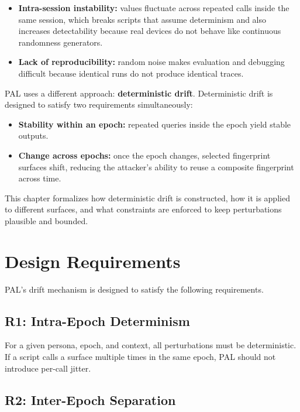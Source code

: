 \documentclass[11pt]{report}
\begin{document}
\begin{itemize}
    \item \textbf{Intra-session instability:} values fluctuate across repeated calls inside the same session, which breaks scripts that assume determinism and also increases detectability because real devices do not behave like continuous randomness generators.
    \item \textbf{Lack of reproducibility:} random noise makes evaluation and debugging difficult because identical runs do not produce identical traces.
\end{itemize}

PAL uses a different approach: \textbf{deterministic drift}. Deterministic drift is designed to satisfy two requirements simultaneously:

\begin{itemize}
    \item \textbf{Stability within an epoch:} repeated queries inside the epoch yield stable outputs.
    \item \textbf{Change across epochs:} once the epoch changes, selected fingerprint surfaces shift, reducing the attacker’s ability to reuse a composite fingerprint across time.
\end{itemize}

This chapter formalizes how deterministic drift is constructed, how it is applied to different surfaces, and what constraints are enforced to keep perturbations plausible and bounded.

\section{Design Requirements}

PAL’s drift mechanism is designed to satisfy the following requirements.

\subsection{R1: Intra-Epoch Determinism}

For a given persona, epoch, and context, all perturbations must be deterministic. If a script calls a surface multiple times in the same epoch, PAL should not introduce per-call jitter.

\subsection{R2: Inter-Epoch Separation}
\end{document}
